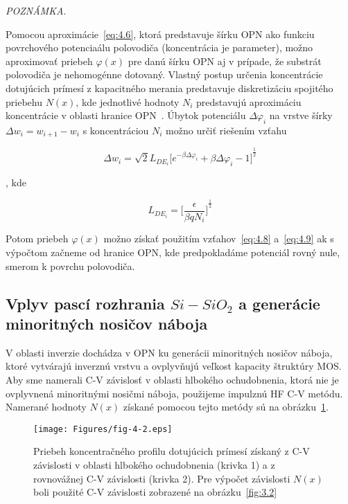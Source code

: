\emph{POZNÁMKA.}

Pomocou aproximácie~\ref{eq:4.6}, ktorá predstavuje šírku OPN ako
funkciu povrchového potenciaálu polovodiča (koncentrácia je
parameter), možno aproximovať priebeh $\varphi(x)$ pre danú šírku OPN
aj v prípade, že substrát polovodiča je nehomogénne dotovaný.  Vlastný
postup určenia koncentrácie dotujúcich prímesí z kapacitného merania
predstavuje diskretizáciu spojitého priebehu $N(x)$, kde jednotlivé
hodnoty $N_i$ predstavujú aproximáciu koncentrácie v oblasti hranice
OPN~\cite{4.1, 4.2, 4.3}.  Úbytok potenciálu $\Delta\varphi_i$ na
vrstve šírky $\Delta w_{i}=w_{i+1}-w_{i}$ s koncentráciou $N_i$ možno
určiť riešením vzťahu

\begin{equation}\label{eq:4.8}
  \Delta w_{i} = \sqrt{2}L_{DE_{i}}{\Big[e^{-\beta\Delta\varphi_{i}} + \beta\Delta\varphi_{i} - 1\Big]}^{\frac{1}{2}}
\end{equation}

, kde

\begin{equation}\label{eq:4.9}
  L_{DE_{i}} = {\bigg[\frac{\epsilon}{\beta qN_{i}}\bigg]}^{\frac{1}{2}}
\end{equation}

Potom priebeh $\varphi(x)$ možno získať použitím vzťahov~\ref{eq:4.8}
a~\ref{eq:4.9} ak s výpočtom začneme od hranice OPN, kde predpokladáme
potenciál rovný nule, smerom k povrchu polovodiča.


\subsection[Vplyv pascí rozhrania $Si-SiO_{2}$ a generácie minoritných nosičov náboja.]{Vplyv pascí rozhrania $Si-SiO_{2}$ a generácie minoritných nosičov náboja}\label{sec:4.1.3}

V oblasti inverzie dochádza v OPN ku generácii minoritných nosičov
náboja, ktoré vytvárajú inverznú vrstvu a ovplyvňujú veľkost kapacity
štruktúry MOS\@. Aby sme namerali C-V závislosť v oblasti hlbokého
ochudobnenia, ktorá nie je ovplyvnená minoritnými nosičmi náboja,
použijeme impulznú HF C-V metódu. Namerané hodnoty $N(x)$ získané
pomocou tejto metódy sú na obrázku~\ref{fig:4.2}.

\begin{figure}[h!]\centering
  \texttt{[image: Figures/fig-4-2.eps]}%
  \caption[Priebeh koncentračného profilu dotujúcich prímesí získaný z
    C-V závislosti v oblasti hlbokého ochudobnenia a z rovnovážnej C-V
    závislosti]{Priebeh koncentračného profilu dotujúcich prímesí
    získaný z C-V závislosti v oblasti hlbokého ochudobnenia (krivka
    1) a z rovnovážnej C-V závislosti (krivka 2). Pre výpočet
    závislosti $N(x)$ boli použité C-V závislosti zobrazené na
    obrázku~\ref{fig:3.2}}\label{fig:4.2}
\end{figure}


